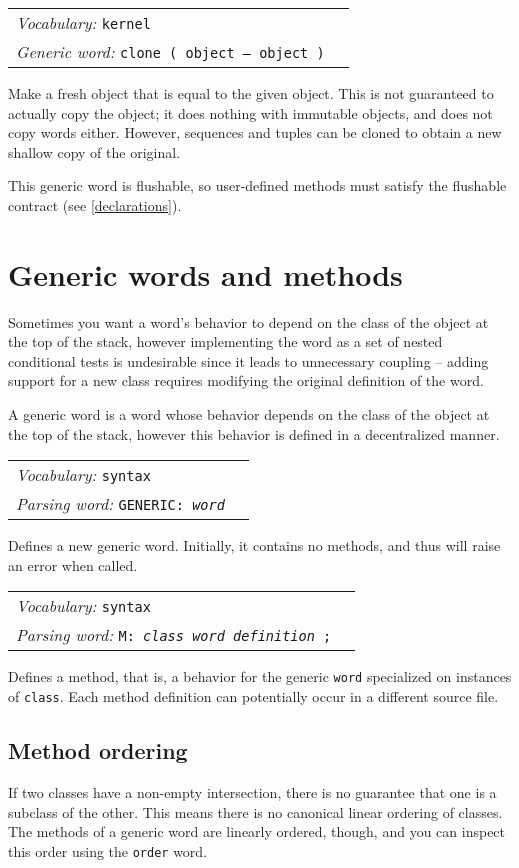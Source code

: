 \documentclass{book}
\newcommand{\vocabulary}[1]{\emph{Vocabulary:} \texttt{#1}&\\}
\newcommand{\parsingword}[2]{\index{\texttt{#1}}\emph{Parsing word:} \texttt{#2}&\\}
\newcommand{\genericword}[2]{\index{\texttt{#1}}\emph{Generic word:} \texttt{#2}&\\}
\newcommand{\wordtable}[1]{


\begin{tabularx}{12cm}{lX}
\hline
#1
\hline
\end{tabularx}

}
\begin{document}
\wordtable{
\vocabulary{kernel}
\genericword{clone}{clone ( object -- object )}
}
Make a fresh object that is equal to the given object. This is not guaranteed to actually copy the object; it does nothing with immutable objects, and does not copy words either. However, sequences and tuples can be cloned to obtain a new shallow copy of the original.

This generic word is flushable, so user-defined methods must satisfy the flushable contract (see \ref{declarations}).

\section{Generic words and methods}\label{generic}

Sometimes  you want a word's behavior to depend on the class of the object at the top of the stack, however implementing the word as a set of nested conditional tests is undesirable since it leads to unnecessary coupling -- adding support for a new class requires modifying the original definition of the word.

A generic word is a word whose behavior depends on the class of the
object at the top of the stack, however this behavior is defined in a
decentralized manner.

\wordtable{
\vocabulary{syntax}
\parsingword{GENERIC:}{GENERIC: \emph{word}}
}
Defines a new generic word. Initially, it contains no methods, and thus will raise an error when called.

\wordtable{
\vocabulary{syntax}
\parsingword{M:}{M: \emph{class} \emph{word} \emph{definition} ;}
}
Defines a method, that is, a behavior for the generic \texttt{word} specialized on instances of \texttt{class}. Each method definition
can potentially occur in a different source file.

\subsection{Method ordering}\label{method-order}

If two classes have a non-empty intersection, there is no guarantee that one is a subclass of the other. This means there is no canonical linear ordering of classes. The methods of a generic word are linearly ordered, though, and you can inspect this order using the \texttt{order} word.
\end{document}
